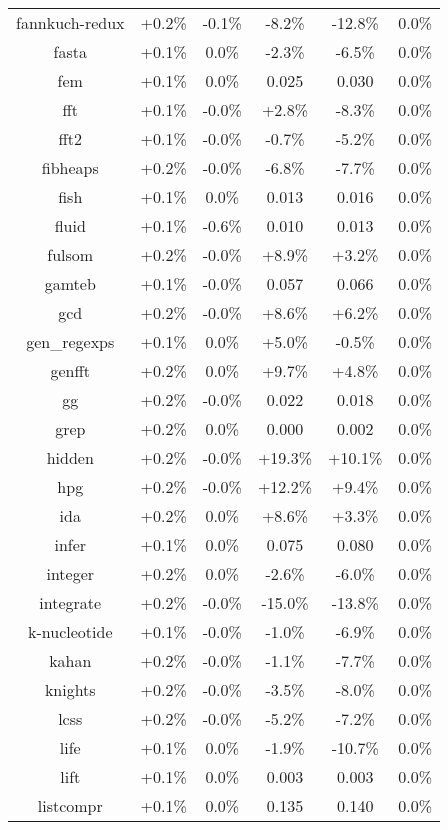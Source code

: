 \begin{tabular}{ c c c c c c }
fannkuch-redux & +0.2\% & -0.1\% & -8.2\% & -12.8\% &  0.0\%\\
fasta & +0.1\% &  0.0\% & -2.3\% & -6.5\% &  0.0\%\\
fem & +0.1\% &  0.0\% & 0.025 & 0.030 &  0.0\%\\
fft & +0.1\% & -0.0\% & +2.8\% & -8.3\% &  0.0\%\\
fft2 & +0.1\% & -0.0\% & -0.7\% & -5.2\% &  0.0\%\\
fibheaps & +0.2\% & -0.0\% & -6.8\% & -7.7\% &  0.0\%\\
fish & +0.1\% &  0.0\% & 0.013 & 0.016 &  0.0\%\\
fluid & +0.1\% & -0.6\% & 0.010 & 0.013 &  0.0\%\\
fulsom & +0.2\% & -0.0\% & +8.9\% & +3.2\% &  0.0\%\\
gamteb & +0.1\% & -0.0\% & 0.057 & 0.066 &  0.0\%\\
gcd & +0.2\% & -0.0\% & +8.6\% & +6.2\% &  0.0\%\\
gen\_regexps & +0.1\% &  0.0\% & +5.0\% & -0.5\% &  0.0\%\\
genfft & +0.2\% &  0.0\% & +9.7\% & +4.8\% &  0.0\%\\
gg & +0.2\% & -0.0\% & 0.022 & 0.018 &  0.0\%\\
grep & +0.2\% &  0.0\% & 0.000 & 0.002 &  0.0\%\\
hidden & +0.2\% & -0.0\% & +19.3\% & +10.1\% &  0.0\%\\
hpg & +0.2\% & -0.0\% & +12.2\% & +9.4\% &  0.0\%\\
ida & +0.2\% &  0.0\% & +8.6\% & +3.3\% &  0.0\%\\
infer & +0.1\% &  0.0\% & 0.075 & 0.080 &  0.0\%\\
integer & +0.2\% &  0.0\% & -2.6\% & -6.0\% &  0.0\%\\
integrate & +0.2\% & -0.0\% & -15.0\% & -13.8\% &  0.0\%\\
k-nucleotide & +0.1\% & -0.0\% & -1.0\% & -6.9\% &  0.0\%\\
kahan & +0.2\% & -0.0\% & -1.1\% & -7.7\% &  0.0\%\\
knights & +0.2\% & -0.0\% & -3.5\% & -8.0\% &  0.0\%\\
lcss & +0.2\% & -0.0\% & -5.2\% & -7.2\% &  0.0\%\\
life & +0.1\% &  0.0\% & -1.9\% & -10.7\% &  0.0\%\\
lift & +0.1\% &  0.0\% & 0.003 & 0.003 &  0.0\%\\
listcompr & +0.1\% &  0.0\% & 0.135 & 0.140 &  0.0\%\\

\end{tabular}
